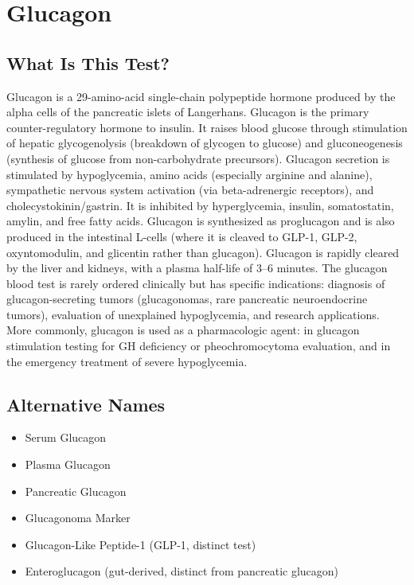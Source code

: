 \chapter{Glucagon}

\section*{What Is This Test?}
Glucagon is a 29-amino-acid single-chain polypeptide hormone produced by the alpha cells of the pancreatic islets of Langerhans. Glucagon is the primary counter-regulatory hormone to insulin. It raises blood glucose through stimulation of hepatic glycogenolysis (breakdown of glycogen to glucose) and gluconeogenesis (synthesis of glucose from non-carbohydrate precursors). Glucagon secretion is stimulated by hypoglycemia, amino acids (especially arginine and alanine), sympathetic nervous system activation (via beta-adrenergic receptors), and cholecystokinin/gastrin. It is inhibited by hyperglycemia, insulin, somatostatin, amylin, and free fatty acids. Glucagon is synthesized as proglucagon and is also produced in the intestinal L-cells (where it is cleaved to GLP-1, GLP-2, oxyntomodulin, and glicentin rather than glucagon). Glucagon is rapidly cleared by the liver and kidneys, with a plasma half-life of 3--6 minutes. The glucagon blood test is rarely ordered clinically but has specific indications: diagnosis of glucagon-secreting tumors (glucagonomas, rare pancreatic neuroendocrine tumors), evaluation of unexplained hypoglycemia, and research applications. More commonly, glucagon is used as a pharmacologic agent: in glucagon stimulation testing for GH deficiency or pheochromocytoma evaluation, and in the emergency treatment of severe hypoglycemia.

\section*{Alternative Names}
\begin{itemize}
  \item Serum Glucagon
  \item Plasma Glucagon
  \item Pancreatic Glucagon
  \item Glucagonoma Marker
  \item Glucagon-Like Peptide-1 (GLP-1, distinct test)
  \item Enteroglucagon (gut-derived, distinct from pancreatic glucagon)
\end{itemize}
